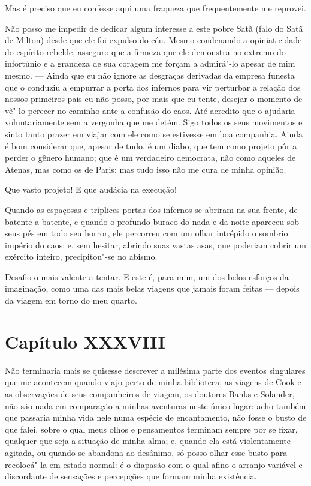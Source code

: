  Mas é preciso que eu confesse aqui uma fraqueza que frequentemente me reprovei. 

 Não posso me impedir de dedicar algum interesse a este pobre Satã (falo
do Satã de Milton) desde que ele foi expulso do céu. Mesmo condenando a
opiniaticidade do espírito rebelde, asseguro que a firmeza que ele
demonstra no extremo do infortúnio e a grandeza de sua coragem me
forçam a admirá"-lo apesar de mim mesmo. --- Ainda que eu não ignore as
desgraças derivadas da empresa funesta que o conduziu a empurrar a
porta dos infernos para vir perturbar a relação dos nossos primeiros
pais eu não posso, por mais que eu tente, desejar o momento de vê"-lo
perecer no caminho ante a confusão do caos. Até acredito que o ajudaria
voluntariamente sem a vergonha que me detém. Sigo todos os seus
movimentos e sinto tanto prazer em viajar com ele como se estivesse em
boa companhia. Ainda é bom considerar que, apesar de tudo, é um diabo,
que tem como projeto pôr a perder o gênero humano; que é um verdadeiro
democrata, não como aqueles de Atenas, mas como os de Paris: mas tudo
isso não me cura de minha opinião.

 Que vasto projeto! E que audácia na execução!

 Quando as espaçosas e tríplices portas dos infernos se abriram na sua
frente, de batente a batente, e quando o profundo buraco do nada e da
noite apareceu sob seus pés em todo seu horror, ele percorreu com um
olhar intrépido o sombrio império do caos; e, sem hesitar, abrindo suas
vastas asas, que poderiam cobrir um exército inteiro, precipitou"-se no
abismo.

 Desafio o mais valente a tentar. E este é, para mim, um dos belos
esforços da imaginação, como uma das mais belas viagens que jamais
foram feitas --- depois da viagem em torno do meu quarto.

\section*{Capítulo XXXVIII}

 Não terminaria mais se quisesse descrever a milésima parte dos eventos
singulares que me acontecem quando viajo perto de minha biblioteca; as
viagens de Cook e as observações de seus companheiros de viagem, os
doutores Banks e Solander, não são nada em comparação a minhas
aventuras neste único lugar: acho também que passaria minha vida nele
numa espécie de encantamento, não fosse o busto de que falei, sobre o
qual meus olhos e pensamentos terminam sempre por se fixar, qualquer
que seja a situação de minha alma; e, quando ela está violentamente
agitada, ou quando se abandona ao desânimo, só posso olhar esse busto
para recolocá"-la em estado normal: é o diapasão com o qual afino o
arranjo variável e discordante de sensações e percepções que formam
minha existência. 

